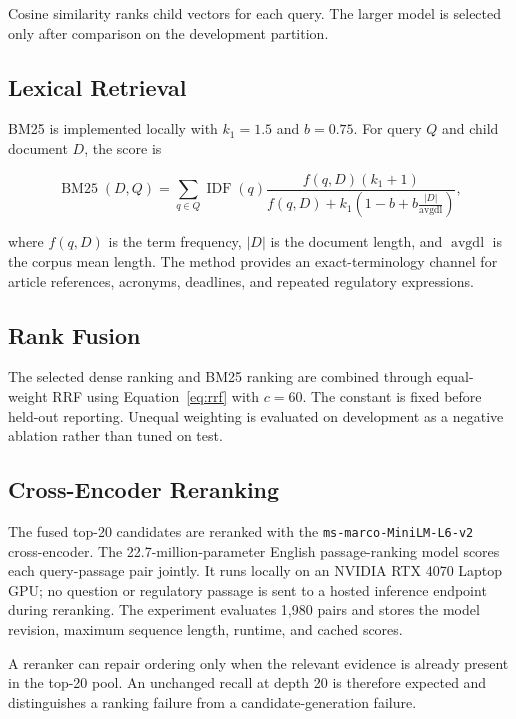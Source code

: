 Cosine similarity ranks child vectors for each query. The larger model is selected only after comparison on the development partition.

\subsection{Lexical Retrieval}

BM25 is implemented locally with $k_1=1.5$ and $b=0.75$. For query $Q$ and child document $D$, the score is

\begin{equation}
\operatorname{BM25}(D,Q) =
\sum_{q \in Q}
\operatorname{IDF}(q)
\frac{f(q,D)(k_1+1)}
     {f(q,D)+k_1\left(1-b+b\frac{|D|}{\operatorname{avgdl}}\right)},
\label{eq:bm25}
\end{equation}

where $f(q,D)$ is the term frequency, $|D|$ is the document length, and $\operatorname{avgdl}$ is the corpus mean length. The method provides an exact-terminology channel for article references, acronyms, deadlines, and repeated regulatory expressions.

\subsection{Rank Fusion}

The selected dense ranking and BM25 ranking are combined through equal-weight \ac{RRF} using Equation~\ref{eq:rrf} with $c=60$. The constant is fixed before held-out reporting. Unequal weighting is evaluated on development as a negative ablation rather than tuned on test.

\subsection{Cross-Encoder Reranking}

The fused top-20 candidates are reranked with the \texttt{ms-marco-MiniLM-L6-v2} cross-encoder. The 22.7-million-parameter English passage-ranking model scores each query-passage pair jointly. It runs locally on an NVIDIA RTX 4070 Laptop GPU; no question or regulatory passage is sent to a hosted inference endpoint during reranking. The experiment evaluates 1,980 pairs and stores the model revision, maximum sequence length, runtime, and cached scores.

A reranker can repair ordering only when the relevant evidence is already present in the top-20 pool. An unchanged recall at depth 20 is therefore expected and distinguishes a ranking failure from a candidate-generation failure.

